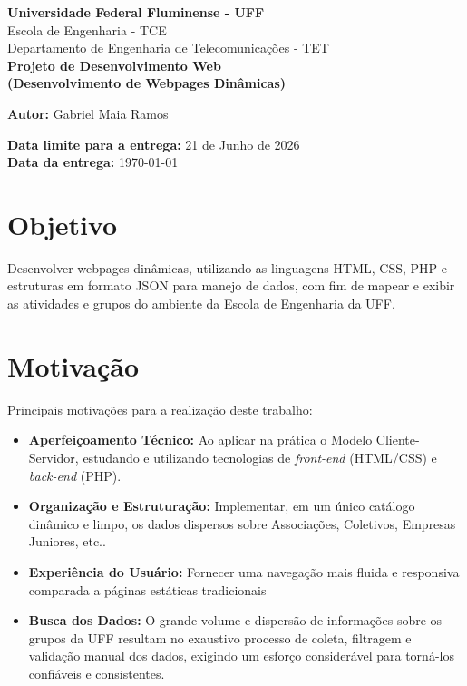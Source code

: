\documentclass[12pt,a4paper]{article}
\begin{document}
\begin{titlepage}
    \centering
    {\large \textbf{Universidade Federal Fluminense - UFF}}
    \\[0.5cm]
    {\large Escola de Engenharia - TCE}
    \\[0.5cm]
    {\large Departamento de Engenharia de Telecomunicações - TET}
    \\[2cm]
    
    {\Large \textbf{Projeto de Desenvolvimento Web\\(Desenvolvimento de Webpages Dinâmicas)}} \\[1cm]
    
    \begin{flushright} %
        \textbf{Autor:} Gabriel Maia Ramos
                \\[9cm]
    \end{flushright}

    
    \begin{flushleft}
        
        \textbf{Data limite para a entrega:} 21 de Junho de 2026 \\
        \textbf{Data da entrega:} \today
    \end{flushleft}
\end{titlepage}

\tableofcontents
\newpage

\section{Objetivo}
 Desenvolver webpages dinâmicas, utilizando as linguagens HTML, CSS, PHP e estruturas em formato JSON para manejo de dados, com fim de mapear e exibir as atividades e grupos do ambiente da Escola de Engenharia da UFF.


\section{Motivação}
Principais motivações para a realização deste trabalho:
\begin{itemize}
    \item \textbf{Aperfeiçoamento Técnico:} Ao aplicar na prática o Modelo Cliente-Servidor, estudando e utilizando tecnologias de \textit{front-end} (HTML/CSS) e \textit{back-end} (PHP).
    \item \textbf{Organização e Estruturação:} Implementar, em um único catálogo  dinâmico e limpo, os dados dispersos sobre Associações, Coletivos, Empresas Juniores, etc..
    \item \textbf{Experiência do Usuário:} Fornecer uma navegação mais fluida e responsiva comparada a páginas estáticas tradicionais
    \item \textbf{Busca dos Dados:} O grande volume e dispersão de informações sobre os grupos da UFF resultam no exaustivo processo de coleta, filtragem e validação manual dos dados, exigindo um esforço considerável para torná-los confiáveis e consistentes.\\
    
\end{itemize}
\end{document}
